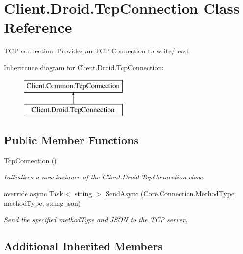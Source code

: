 \hypertarget{classClient_1_1Droid_1_1TcpConnection}{}\section{Client.\+Droid.\+Tcp\+Connection Class Reference}
\label{classClient_1_1Droid_1_1TcpConnection}


T\+C\+P connection. Provides an T\+C\+P Connection to write/read.  


Inheritance diagram for Client.\+Droid.\+Tcp\+Connection\+:\begin{figure}[H]
\begin{center}
\leavevmode
\includegraphics[height=2.000000cm]{classClient_1_1Droid_1_1TcpConnection}
\end{center}
\end{figure}
\subsection*{Public Member Functions}
\begin{DoxyCompactItemize}
\item 
\hyperlink{classClient_1_1Droid_1_1TcpConnection_a09128b5909e5fe446a33b0817ee86849}{Tcp\+Connection} ()
\begin{DoxyCompactList}\small\item\em Initializes a new instance of the \hyperlink{classClient_1_1Droid_1_1TcpConnection}{Client.\+Droid.\+Tcp\+Connection} class. \end{DoxyCompactList}\item 
override async Task$<$ string $>$ \hyperlink{classClient_1_1Droid_1_1TcpConnection_a5eaded083b4d1bd17ddc6831e3181e60}{Send\+Async} (\hyperlink{namespaceCore_1_1Connection_a759585506f1f7f357beb5c5460a7f4f5}{Core.\+Connection.\+Method\+Type} method\+Type, string json)
\begin{DoxyCompactList}\small\item\em Send the specified method\+Type and J\+S\+O\+N to the T\+C\+P server. \end{DoxyCompactList}\end{DoxyCompactItemize}
\subsection*{Additional Inherited Members}


